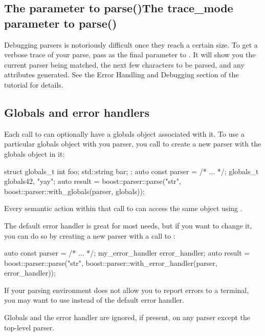 \documentclass{MyBook}
\begin{document}
\subsection{{The  parameter to parse()}{The trace\_mode parameter to parse()}}

Debugging parsers is notoriously difficult once they reach a certain size. To get a verbose trace of your parse, pass  as the final parameter to . It will show you the current parser being matched, the next few characters to be parsed, and any attributes generated. See the Error Handling and Debugging section of the tutorial for details.

\subsection{Globals and error handlers}

Each call to  can optionally have a globals object associated with it. To use a particular globals object with you parser, you call  to create a new parser with the globals object in it:

\begin{code}
struct globals_t
{
    int foo;
    std::string bar;
};
auto const parser = /* ... */;
globals_t globals{42, "yay"};
auto result = boost::parser::parse("str", boost::parser::with_globals(parser, globals));
\end{code}

Every semantic action within that call to  can access the same  object using .

The default error handler is great for most needs, but if you want to change it, you can do so by creating a new parser with a call to :

\begin{code}
auto const parser = /* ... */;
my_error_handler error_handler;
auto result = boost::parser::parse("str", boost::parser::with_error_handler(parser, error_handler));
\end{code}

\begin{marker}[title=Tip ]
If your parsing environment does not allow you to report errors to a terminal, you may want to use  instead of the default error handler. 
\end{marker}

\begin{marker}[title=Important ]
Globals and the error handler are ignored, if present, on any parser except the top-level parser. 
\end{marker}
\end{document}
